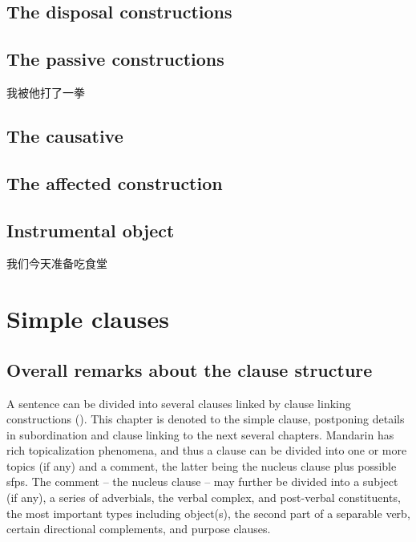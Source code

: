 \documentclass[UTF8, a4paper, oneside, scheme=plain]{ctexrep}
\begin{document}
\section{The disposal constructions}\label{sec:disposal-construction}

\section{The passive constructions}\label{sec:affected-construction}

\begin{exe}
    \ex 我被他打了一拳
\end{exe}

\section{The causative}

\section{The affected construction}



\section{Instrumental object}

\begin{exe}
    \ex 我们今天准备吃食堂
\end{exe}

\chapter{Simple clauses}

\section{Overall remarks about the clause structure}

A sentence can be divided into several clauses linked by clause linking constructions 
().
This chapter is denoted to the simple clause,
postponing details in subordination and clause linking to the next several chapters.
Mandarin has rich topicalization phenomena,
and thus a clause can be divided into
one or more topics (if any) and a comment,
the latter being the nucleus clause
plus possible \acl{sfp}s.
The comment -- the nucleus clause -- may further be divided into a subject (if any),
a series of adverbials, 
the verbal complex, and post-verbal constituents,
the most important types including object(s), 
the second part of a separable verb,
certain directional complements,
and purpose clauses.
\end{document}

